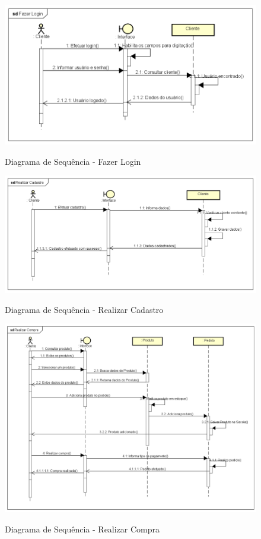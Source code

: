 \begin{figure}[H]
    \centering
    \caption{Diagrama de Sequência - Fazer Login}
    \includegraphics[width=1.0\textwidth]{./dados/figuras/7}
    \label{fig:figura-1}
\end{figure}
\begin{figure}[H]
    \centering
    \caption{Diagrama de Sequência - Realizar Cadastro}
    \includegraphics[width=1.0\textwidth]{./dados/figuras/8}
    \label{fig:figura-1}
\end{figure}
\begin{figure}[H]
    \centering
    \caption{Diagrama de Sequência - Realizar Compra}
    \includegraphics[width=1.0\textwidth]{./dados/figuras/9}
    \label{fig:figura-1}
\end{figure}

